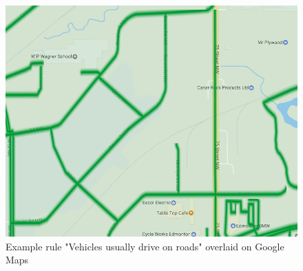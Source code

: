 \begin{figure}
\includegraphics[scale=0.28]{figures/OSMRoadProb.png}
\caption{Example rule "Vehicles usually drive on roads" overlaid on Google Maps}
\label{fig:ex:osm}
\end{figure}
